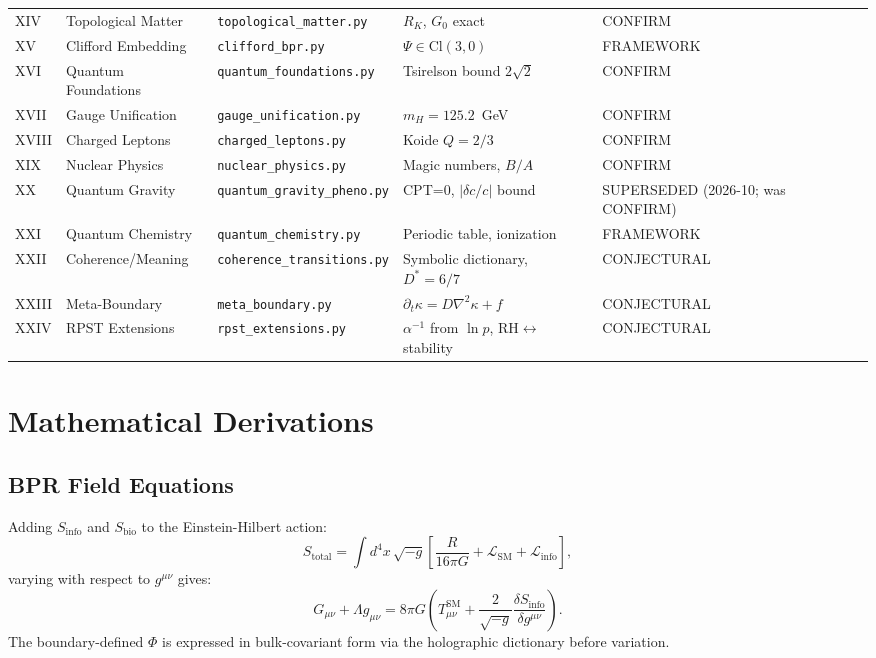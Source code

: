 \documentclass[12pt,oneside]{book}
\theoremstyle{definition}
\begin{document}
\begin{longtable}{@{}llp{3.2cm}p{5.5cm}l@{}}
  XIV & Topological Matter   & \texttt{topological\_matter.py}& $R_K$, $G_0$ exact             & CONFIRM\\
  XV  & Clifford Embedding   & \texttt{clifford\_bpr.py}   & $\Psi\in\mathrm{Cl}(3,0)$          & FRAMEWORK\\
  XVI & Quantum Foundations  & \texttt{quantum\_foundations.py}& Tsirelson bound $2\sqrt{2}$   & CONFIRM\\
  XVII& Gauge Unification    & \texttt{gauge\_unification.py}& $m_H = 125.2$~GeV              & CONFIRM\\
  XVIII& Charged Leptons     & \texttt{charged\_leptons.py}& Koide $Q=2/3$                       & CONFIRM\\
  XIX & Nuclear Physics      & \texttt{nuclear\_physics.py}& Magic numbers, $B/A$               & CONFIRM\\
  XX  & Quantum Gravity      & \texttt{quantum\_gravity\_pheno.py}& CPT=0, $|\delta c/c|$ bound & SUPERSEDED (2026-10; was CONFIRM)\\
  XXI & Quantum Chemistry    & \texttt{quantum\_chemistry.py}& Periodic table, ionization       & FRAMEWORK\\
  XXII& Coherence/Meaning    & \texttt{coherence\_transitions.py}& Symbolic dictionary, $D^*=6/7$ & CONJECTURAL\\
  XXIII& Meta-Boundary       & \texttt{meta\_boundary.py}  & $\partial_t\kappa = D\nabla^2\kappa + f$ & CONJECTURAL\\
  XXIV& RPST Extensions      & \texttt{rpst\_extensions.py}& $\alpha^{-1}$ from $\ln p$, RH$\leftrightarrow$stability & CONJECTURAL\\
  \bottomrule
\end{longtable}

\chapter{Mathematical Derivations}
\label{app:derivations}

\section{BPR Field Equations}

Adding $S_{\mathrm{info}}$ and $S_{\mathrm{bio}}$ to the Einstein-Hilbert action:
\begin{equation}
  S_{\mathrm{total}} = \int d^4x\,\sqrt{-g}\!\left[
    \frac{R}{16\pi G} + \mathcal{L}_{\mathrm{SM}} + \mathcal{L}_{\mathrm{info}}
  \right],
\end{equation}
varying with respect to $g^{\mu\nu}$ gives:
\begin{equation}
  G_{\mu\nu} + \Lambda g_{\mu\nu}
  = 8\pi G\!\left(T^{\mathrm{SM}}_{\mu\nu}
    + \frac{2}{\sqrt{-g}}\frac{\delta S_{\mathrm{info}}}{\delta g^{\mu\nu}}\right).
\end{equation}
The boundary-defined $\Phi$ is expressed in bulk-covariant form via the holographic
dictionary before variation.
\end{document}
